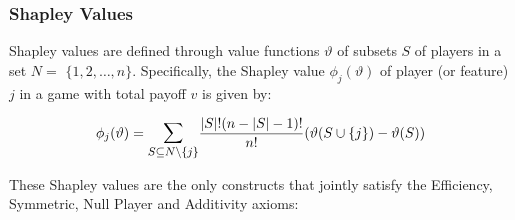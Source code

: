 \documentclass{article} %
\theoremstyle{bfnote}
\begin{document}
%
%
%

\subsubsection{Shapley Values}
Shapley values are defined through value functions $\vartheta$ of subsets $S$ of players in a set $N=$ $\{1,2, \ldots, n\}$. Specifically, the Shapley value $\phi_j(\vartheta)$ of player (or feature) $j$ in a game with total payoff $v$ is given by:

\begin{equation}
	\phi_j(\vartheta)=\mathlarger{\sum\limits_{S \subseteq N \backslash\{j\}}} \frac{|S| !(n-|S|-1) !}{n !}(\vartheta(S \cup\{j\})-\vartheta(S))
	\label{eq:7}
\end{equation}

These Shapley values are the only constructs that jointly satisfy the Efficiency, Symmetric, Null Player and Additivity axioms:
\end{document}
